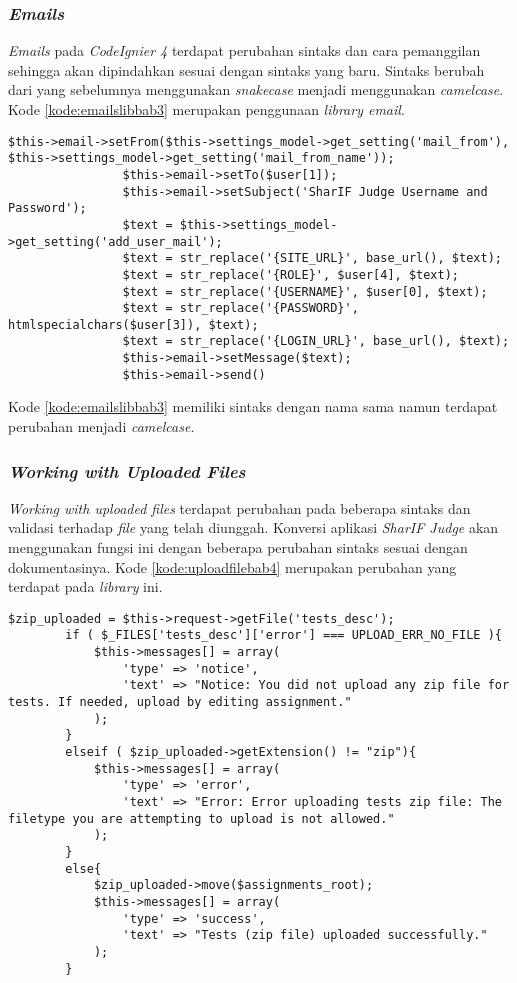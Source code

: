 \subsubsection{\textit{Emails}}
\textit{Emails} pada \textit{CodeIgnier 4} terdapat perubahan sintaks dan cara pemanggilan sehingga akan dipindahkan sesuai dengan sintaks yang baru. Sintaks berubah dari yang sebelumnya menggunakan \textit{snakecase} menjadi menggunakan \textit{camelcase}. Kode \ref{kode:emailslibbab3} merupakan penggunaan \textit{library email}.

\begin{lstlisting}[caption=Perubahan penggunaan sintaks pada \textit{library emails}, label=kode:emailslibbab3]
$this->email->setFrom($this->settings_model->get_setting('mail_from'), $this->settings_model->get_setting('mail_from_name'));
				$this->email->setTo($user[1]);
				$this->email->setSubject('SharIF Judge Username and Password');
				$text = $this->settings_model->get_setting('add_user_mail');
				$text = str_replace('{SITE_URL}', base_url(), $text);
				$text = str_replace('{ROLE}', $user[4], $text);
				$text = str_replace('{USERNAME}', $user[0], $text);
				$text = str_replace('{PASSWORD}', htmlspecialchars($user[3]), $text);
				$text = str_replace('{LOGIN_URL}', base_url(), $text);
				$this->email->setMessage($text);
				$this->email->send()
\end{lstlisting}

Kode \ref{kode:emailslibbab3} memiliki sintaks dengan nama sama namun terdapat perubahan menjadi \textit{camelcase}.

\subsubsection{\textit{Working with Uploaded Files}}
\textit{Working with uploaded files} terdapat perubahan pada beberapa sintaks dan validasi terhadap \textit{file} yang telah diunggah. Konversi aplikasi \textit{SharIF Judge} akan menggunakan fungsi ini dengan beberapa perubahan sintaks sesuai dengan dokumentasinya. Kode \ref{kode:uploadfilebab4} merupakan perubahan yang terdapat pada \textit{library} ini. 
\begin{lstlisting}[caption=Perancangan perubahan \textit{library upload} pada \textit{CodeIgniter 4}, label=kode:uploadfilebab4]
$zip_uploaded = $this->request->getFile('tests_desc');
		if ( $_FILES['tests_desc']['error'] === UPLOAD_ERR_NO_FILE ){
			$this->messages[] = array(
				'type' => 'notice',
				'text' => "Notice: You did not upload any zip file for tests. If needed, upload by editing assignment."
			);
		}
		elseif ( $zip_uploaded->getExtension() != "zip"){
			$this->messages[] = array(
				'type' => 'error',
				'text' => "Error: Error uploading tests zip file: The filetype you are attempting to upload is not allowed."
			);
		}
		else{
			$zip_uploaded->move($assignments_root);
			$this->messages[] = array(
				'type' => 'success',
				'text' => "Tests (zip file) uploaded successfully."
			);
		}
\end{lstlisting}

